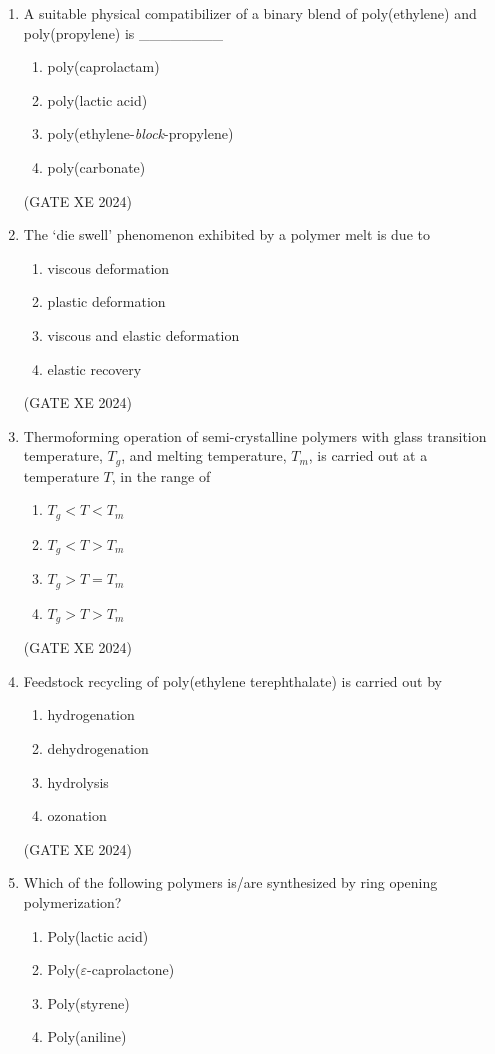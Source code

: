 \documentclass[12pt]{article}
\begin{document}
\begin{enumerate}
(GATE XE 2024)

\item A suitable physical compatibilizer of a binary blend of poly(ethylene) and poly(propylene) is \_\_\_\_\_\_\_\_  
\begin{enumerate}
\item poly(caprolactam)  
\item poly(lactic acid)  
\item poly(ethylene-\textit{block}-propylene)  
\item poly(carbonate)  
\end{enumerate}  

(GATE XE 2024)

\item The ‘die swell’ phenomenon exhibited by a polymer melt is due to  
\begin{enumerate}
\item viscous deformation  
\item plastic deformation  
\item viscous and elastic deformation  
\item elastic recovery  
\end{enumerate}  

(GATE XE 2024)

\item Thermoforming operation of semi-crystalline polymers with glass transition temperature, $T_g$, and melting temperature, $T_m$, is carried out at a temperature $T$, in the range of  
\begin{enumerate}
\item $T_g < T < T_m$  
\item $T_g < T > T_m$  
\item $T_g > T = T_m$  
\item $T_g > T > T_m$  
\end{enumerate}  

(GATE XE 2024)

\item Feedstock recycling of poly(ethylene terephthalate) is carried out by  
\begin{enumerate}
\item hydrogenation  
\item dehydrogenation  
\item hydrolysis  
\item ozonation  
\end{enumerate}  

(GATE XE 2024)

\item Which of the following polymers is/are synthesized by ring opening polymerization?  
\begin{enumerate}
\item Poly(lactic acid)  
\item Poly($\varepsilon$-caprolactone)  
\item Poly(styrene)  
\item Poly(aniline)  
\end{enumerate}  


\end{enumerate}
\end{document}
